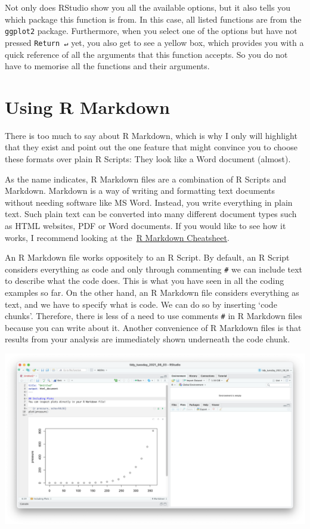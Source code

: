 \documentclass[
]{book}
\begin{document}
Not only does RStudio show you all the available options, but it also tells you which package this function is from. In this case, all listed functions are from the \texttt{ggplot2} package. Furthermore, when you select one of the options but have not pressed \texttt{Return\ ↵} yet, you also get to see a yellow box, which provides you with a quick reference of all the arguments that this function accepts. So you do not have to memorise all the functions and their arguments.

\hypertarget{r-markdown-and-r-notebooks}{%
\section{Using R Markdown}\label{r-markdown-and-r-notebooks}}

There is too much to say about R Markdown, which is why I only will highlight that they exist and point out the one feature that might convince you to choose these formats over plain R Scripts: They look like a Word document (almost).

As the name indicates, R Markdown files are a combination of R Scripts and Markdown. Markdown is a way of writing and formatting text documents without needing software like MS Word. Instead, you write everything in plain text. Such plain text can be converted into many different document types such as HTML websites, PDF or Word documents. If you would like to see how it works, I recommend looking at the~\href{https://www.rstudio.com/resources/cheatsheets/}{R Markdown Cheatsheet}.

An R Markdown file works oppositely to an R Script. By default, an R Script considers everything as code and only through commenting \texttt{\#} we can include text to describe what the code does. This is what you have seen in all the coding examples so far. On the other hand, an R Markdown file considers everything as text, and we have to specify what is code. We can do so by inserting `code chunks'. Therefore, there is less of a need to use comments \texttt{\#} in R Markdown files because you can write about it. Another convenience of R Markdown files is that results from your analysis are immediately shown underneath the code chunk.

\includegraphics{images/chapter_06_img/03_r_markdown/01_r_markdown_plain.png}
\end{document}
